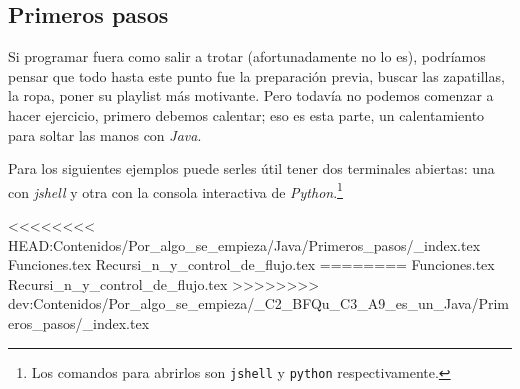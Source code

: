 \subsection{Primeros pasos}
  Si programar fuera como salir a trotar (afortunadamente no lo es), podríamos pensar que todo hasta
  este punto fue la preparación previa, buscar las zapatillas, la ropa, poner su playlist más 
  motivante.
  Pero todavía no podemos comenzar a hacer ejercicio, primero debemos calentar; eso es esta parte, 
  un calentamiento para soltar las manos con \textit{Java}.

  Para los siguientes ejemplos puede serles útil tener dos terminales abiertas: una con 
  \textit{jshell} y otra con la consola interactiva de \textit{Python}.\footnote{Los comandos para 
  abrirlos son \texttt{jshell} y \texttt{python} respectivamente.}

<<<<<<<< HEAD:Contenidos/Por_algo_se_empieza/Java/Primeros_pasos/_index.tex
  {Funciones.tex}
  {Recursi_n_y_control_de_flujo.tex}
========
  {Funciones.tex}
  {Recursi_n_y_control_de_flujo.tex}
>>>>>>>> dev:Contenidos/Por_algo_se_empieza/_C2_BFQu_C3_A9_es_un_Java/Primeros_pasos/_index.tex

